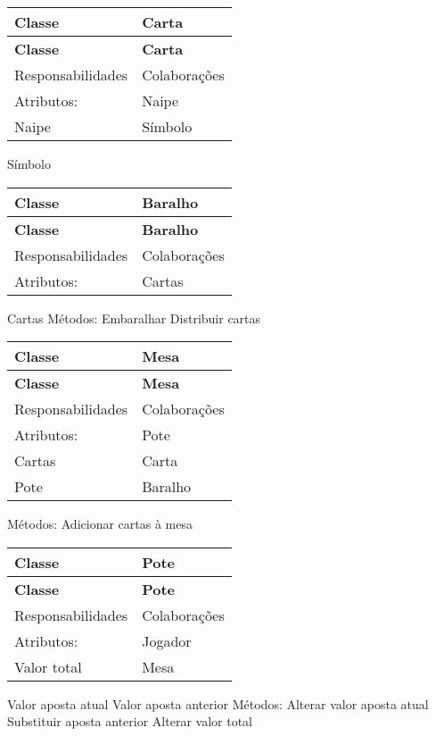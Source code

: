 \tabulinesep=1mm
\begin{longtabu} spread 0pt [c]{*{2}{|X[-1]}|}
\hline
\rowcolor{\tableheadbgcolor}\textbf{ Classe }&\textbf{ Carta  }\\
\endfirsthead
\hline
\endfoot
\hline
\rowcolor{\tableheadbgcolor}\textbf{ Classe }&\textbf{ Carta  }\\
\endhead
Responsabilidades &Colaborações \\
Atributos\+: &Naipe \\
Naipe &Símbolo \\
\end{longtabu}
Símbolo

\tabulinesep=1mm
\begin{longtabu} spread 0pt [c]{*{2}{|X[-1]}|}
\hline
\rowcolor{\tableheadbgcolor}\textbf{ Classe }&\textbf{ Baralho  }\\
\endfirsthead
\hline
\endfoot
\hline
\rowcolor{\tableheadbgcolor}\textbf{ Classe }&\textbf{ Baralho  }\\
\endhead
Responsabilidades &Colaborações \\
Atributos\+: &Cartas \\
\end{longtabu}
Cartas Métodos\+: Embaralhar Distribuir cartas

\tabulinesep=1mm
\begin{longtabu} spread 0pt [c]{*{2}{|X[-1]}|}
\hline
\rowcolor{\tableheadbgcolor}\textbf{ Classe }&\textbf{ Mesa  }\\
\endfirsthead
\hline
\endfoot
\hline
\rowcolor{\tableheadbgcolor}\textbf{ Classe }&\textbf{ Mesa  }\\
\endhead
Responsabilidades &Colaborações \\
Atributos\+: &Pote \\
Cartas &Carta \\
Pote &Baralho \\
\end{longtabu}
Métodos\+: Adicionar cartas à mesa

\tabulinesep=1mm
\begin{longtabu} spread 0pt [c]{*{2}{|X[-1]}|}
\hline
\rowcolor{\tableheadbgcolor}\textbf{ Classe }&\textbf{ Pote  }\\
\endfirsthead
\hline
\endfoot
\hline
\rowcolor{\tableheadbgcolor}\textbf{ Classe }&\textbf{ Pote  }\\
\endhead
Responsabilidades &Colaborações \\
Atributos\+: &Jogador \\
Valor total &Mesa \\
\end{longtabu}
Valor aposta atual Valor aposta anterior Métodos\+: Alterar valor aposta atual Substituir aposta anterior Alterar valor total

